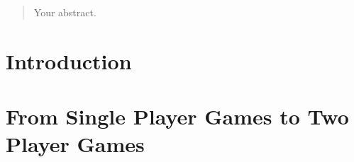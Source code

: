 \documentclass[12pt,twoside]{report}
\date{September 2015}
\begin{document}



\clearpage{\pagestyle{empty}\cleardoublepage}
\setcounter{page}{1}
\pagestyle{fancy}

\begin{abstract}
Your abstract.
\end{abstract}

\cleardoublepage

\clearpage{\pagestyle{empty}\cleardoublepage}

\tableofcontents 


\clearpage{\pagestyle{empty}\cleardoublepage}
\setcounter{page}{1}
\fancyhead[LE,RO]{\slshape \rightmark}
\fancyhead[LO,RE]{\slshape \leftmark}






\chapter{Introduction}






\chapter{From Single Player Games to Two Player Games}
\end{document}
